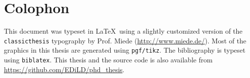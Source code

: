 
\pagestyle{empty}

\hfill

\vfill


\section*{Colophon}
This document was typeset in \LaTeX~using a slightly customized version of the 
\texttt{classicthesis} typography by Prof. Miede (\url{http://www.miede.de/}). Most of the graphics in this thesis are generated using \texttt{pgf/tikz}.
The bibliography is typeset using \texttt{biblatex}.
This thesis and the source code is also available from \url{https://github.com/EDiLD/phd_thesis}.
